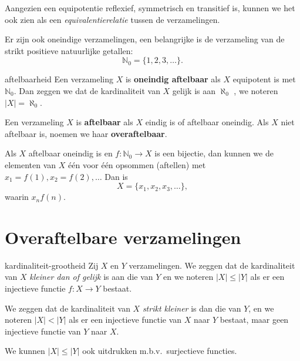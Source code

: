 Aangezien een equipotentie reflexief, symmetrisch en transitief is, kunnen we het ook zien als een \emph{equivalentierelatie} tussen de verzamelingen.

Er zijn ook oneindige verzamelingen, een belangrijke is de verzameling van de strikt positieve natuurlijke getallen:
\[
    \mathbb{N}_0 = \{1,2,3, \ldots\}.
\]

\begin{definitie}{}{aftelbaarheid}
    Een verzameling $X$ is \textbf{oneindig aftelbaar} als $X$ equipotent is met $\mathbb{N}_0$.
    Dan zeggen we dat de kardinaliteit van $X$ gelijk is aan $\aleph_0$ ,
    we noteren $\lvert X\rvert = \aleph_0$.

    Een verzameling $X$ is \textbf{aftelbaar} als $X$ eindig is of aftelbaar oneindig.
    Als $X$ niet aftelbaar is, noemen we haar \textbf{overaftelbaar}.
\end{definitie}
Als $X$ aftelbaar oneindig is en $f: \mathbb{N}_0 \to X$ is een bijectie, dan kunnen we de elementen van $X$ één voor één opsommen (aftellen) met $x_1 = f(1), x_2 = f(2), \ldots$ 
Dan is
\[
    X = \{x_1, x_2, x_3, \ldots\},
\] waarin $x_n f(n)$.


\section{Overaftelbare verzamelingen}
\begin{definitie}{}{kardinaliteit-grootheid}
    Zij $X$ en $Y$ verzamelingen.
    We zeggen dat de kardinaliteit van $X$ \emph{kleiner dan of gelijk} is aan die van $Y$ en we noteren $\lvert X\rvert \leq \lvert Y\rvert$ als er een injectieve functie $f: X \to Y$ bestaat.

    We zeggen dat de kardinaliteit van $X$ \emph{strikt kleiner} is dan die van $Y$, en we noteren $\lvert X\rvert < \lvert Y\rvert$ als er een injectieve functie van $X$ naar $Y$ bestaat, maar geen injectieve functie van $Y$ naar $X$.
\end{definitie}
We kunnen $\lvert X\rvert \leq \lvert Y\rvert$ ook uitdrukken m.b.v.\ surjectieve functies.

